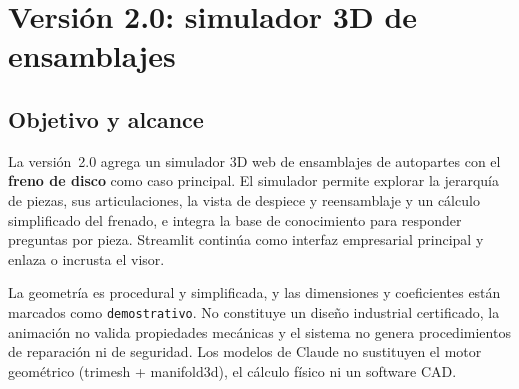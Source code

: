 \chapter{Versión 2.0: simulador 3D de ensamblajes}\label{cap:simulador}

\section{Objetivo y alcance}
La versión~2.0 agrega un simulador 3D web de ensamblajes de autopartes con el \textbf{freno de disco} como caso
principal. El simulador permite explorar la jerarquía de piezas, sus articulaciones, la vista de despiece y
reensamblaje y un cálculo simplificado del frenado, e integra la base de conocimiento para responder preguntas por
pieza. Streamlit continúa como interfaz empresarial principal y enlaza o incrusta el visor.

\begin{nota}
La geometría es procedural y simplificada, y las dimensiones y coeficientes están marcados como
\texttt{demostrativo}. No constituye un diseño industrial certificado, la animación no valida propiedades mecánicas
y el sistema no genera procedimientos de reparación ni de seguridad. Los modelos de Claude no sustituyen el motor
geométrico (trimesh + manifold3d), el cálculo físico ni un software CAD.
\end{nota}

